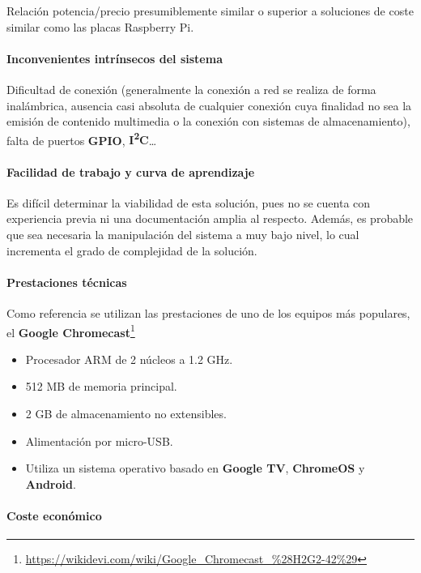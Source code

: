 Relación potencia/precio presumiblemente similar o superior a soluciones de coste similar como las placas Raspberry Pi.

\paragraph{Inconvenientes intrínsecos del sistema\\}

Dificultad de conexión (generalmente la conexión a red se realiza de forma inalámbrica, ausencia casi absoluta de cualquier conexión cuya finalidad no sea la emisión de contenido multimedia o la conexión con sistemas de almacenamiento), falta de puertos \textbf{GPIO}, \textbf{I\textsuperscript{2}C}\dots

\paragraph{Facilidad de trabajo y curva de aprendizaje\\}

Es difícil determinar la viabilidad de esta solución, pues no se cuenta con experiencia previa ni una documentación amplia al respecto. Además, es probable que sea necesaria la manipulación del sistema a muy bajo nivel, lo cual incrementa el grado de complejidad de la solución.

\paragraph{Prestaciones técnicas\\}

Como referencia se utilizan las prestaciones de uno de los equipos más populares, el \textbf{Google Chromecast}\footnote{\href{https://wikidevi.com/wiki/Google\_Chromecast\_\%28H2G2-42\%29}{https://wikidevi.com/wiki/Google\_Chromecast\_\%28H2G2-42\%29}}
\begin{itemize}
  \item Procesador ARM de 2 núcleos a 1.2 GHz.
  \item 512 MB de memoria principal.
  \item 2 GB de almacenamiento no extensibles.
  \item Alimentación por micro-USB.
  \item Utiliza un sistema operativo basado en \textbf{Google TV}, \textbf{ChromeOS} y \textbf{Android}.
\end{itemize}

\paragraph{Coste económico\\}

